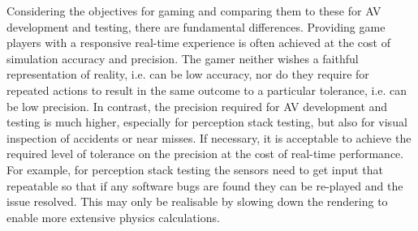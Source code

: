 \documentclass[letterpaper, 10 pt, journal, twoside]{IEEEtran}
\begin{document}


%
%
Considering the objectives for gaming and comparing them to these for AV development and testing, there are fundamental differences. Providing game players with a responsive real-time experience is often achieved at the cost of simulation accuracy and precision. The gamer neither wishes a faithful representation of reality, i.e. can be low accuracy, nor do they require for repeated actions to result in the same outcome to a particular tolerance, i.e. can be low precision. In contrast, the precision required for AV development and testing is much higher, especially for perception stack testing, but also for visual inspection of accidents or near misses. If necessary, it is acceptable to achieve the required level of tolerance on the precision at the cost of real-time performance. For example, for perception stack testing the sensors need to get input that repeatable so that if any software bugs are found they can be re-played and the issue resolved. This  may only be realisable by slowing down the rendering to enable more extensive physics calculations.
\end{document}
